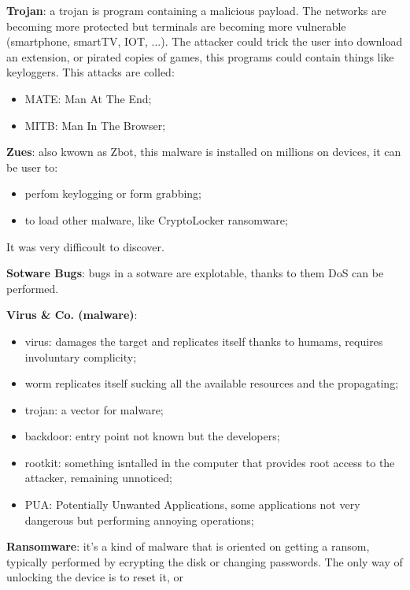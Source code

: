 \documentclass[12pt]{article}
\begin{document}
\textbf{Trojan}: a trojan is program containing a malicious payload. The networks are becoming more protected but terminals are becoming more vulnerable (smartphone, smartTV, IOT, ...). The attacker could trick the user into download an extension, or pirated copies of games, this programs could contain things like keyloggers. This attacks are colled:
\begin{itemize}
    \item MATE: Man At The End;
    \item MITB: Man In The Browser;
\end{itemize}

\textbf{Zues}: also kwown as Zbot, this malware is installed on millions on devices, it can be user to:
\begin{itemize}
    \item perfom keylogging or form grabbing;
    \item to load other malware, like CryptoLocker ransomware;
\end{itemize}
It was very difficoult to discover.

\textbf{Sotware Bugs}: bugs in a sotware are explotable, thanks to them DoS can be performed.

\textbf{Virus \& Co. (malware)}: 
\begin{itemize}
    \item virus: damages the target and replicates itself thanks to humams, requires involuntary complicity;
    \item worm replicates itself sucking all the available resources and the propagating;
    \item trojan: a vector for malware;
    \item backdoor: entry point not known but the developers;
    \item rootkit: something isntalled in the computer that provides root access to the attacker, remaining unnoticed;
    \item PUA: Potentially Unwanted Applications, some applications not very dangerous but performing annoying operations;
\end{itemize}


\textbf{Ransomware}: it's a kind of malware that is oriented on getting a ransom, typically performed by ecrypting the disk or changing passwords. The only way of unlocking the device is to reset it, or 
\end{document}

